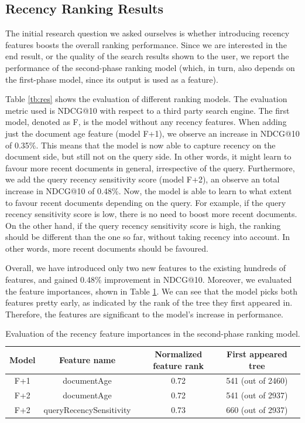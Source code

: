 \subsection{Recency Ranking Results}
The initial research question we asked ourselves is whether introducing recency features boosts the overall ranking performance. Since we are interested in the end result, or the quality of the search results shown to the user, we report the performance of the second-phase ranking model (which, in turn, also depends on the first-phase model, since its output is used as a feature).

Table \ref{tb:res} shows the evaluation of different ranking models. The evaluation metric used is NDCG@10 with respect to a third party search engine. The first model, denoted as F, is the model without any recency features. When adding just the document age feature (model F+1), we observe an increase in NDCG@10 of 0.35\%. This means that the model is now able to capture recency on the document side, but still not on the query side. In other words, it might learn to favour more recent documents in general, irrespective of the query. Furthermore, we add the query recency sensitivity score (model F+2), an observe an total increase in NDCG@10 of 0.48\%. Now, the model is able to learn to what extent to favour recent documents depending on the query. For example, if the query recency sensitivity score is low, there is no need to boost more recent documents. On the other hand, if the query recency sensitivity score is high, the ranking should be different than the one so far, without taking recency into account. In other words, more recent documents should be favoured.

Overall, we have introduced only two new features to the existing hundreds of features, and gained 0.48\% improvement in NDCG@10. Moreover, we evaluated the feature importances, shown in Table \ref{tb:f-imp-doc}. We can see that the model picks both features pretty early, as indicated by the rank of the tree they first appeared in. Therefore, the features are significant to the model's increase in performance.

\begin{table}[]
\centering
\caption{Evaluation of the recency feature importances in the second-phase ranking model.}
\label{tb:f-imp-doc}
\begin{tabular}{@{}ccccc@{}}
\toprule
Model & Feature name & Normalized feature rank & First appeared tree \\ \midrule
F+1 & documentAge & 0.72 & 541 (out of 2460) \\
F+2 & documentAge & 0.72 & 541 (out of 2937) \\
F+2 & queryRecencySensitivity & 0.73 & 660 (out of 2937) \\ \bottomrule
\end{tabular}
\end{table}

